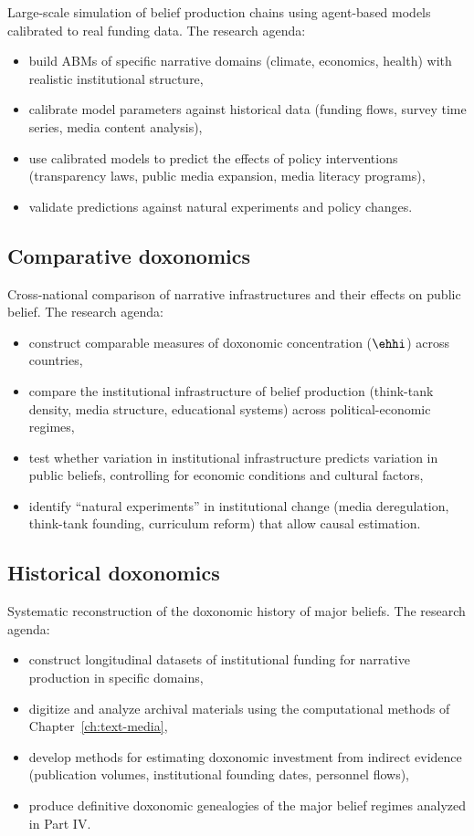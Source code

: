 Large-scale simulation of belief production chains using agent-based models calibrated to real funding data.
The research agenda:
\begin{itemize}[nosep]
  \item build ABMs of specific narrative domains (climate, economics, health) with realistic institutional structure,
  \item calibrate model parameters against historical data (funding flows, survey time series, media content analysis),
  \item use calibrated models to predict the effects of policy interventions (transparency laws, public media expansion, media literacy programs),
  \item validate predictions against natural experiments and policy changes.
\end{itemize}

\subsection{Comparative doxonomics}

Cross-national comparison of narrative infrastructures and their effects on public belief.
The research agenda:
\begin{itemize}[nosep]
  \item construct comparable measures of doxonomic concentration ($\ehhi$) across countries,
  \item compare the institutional infrastructure of belief production (think-tank density, media structure, educational systems) across political-economic regimes,
  \item test whether variation in institutional infrastructure predicts variation in public beliefs, controlling for economic conditions and cultural factors,
  \item identify ``natural experiments'' in institutional change (media deregulation, think-tank founding, curriculum reform) that allow causal estimation.
\end{itemize}

\subsection{Historical doxonomics}

Systematic reconstruction of the doxonomic history of major beliefs.
The research agenda:
\begin{itemize}[nosep]
  \item construct longitudinal datasets of institutional funding for narrative production in specific domains,
  \item digitize and analyze archival materials using the computational methods of Chapter~\ref{ch:text-media},
  \item develop methods for estimating doxonomic investment from indirect evidence (publication volumes, institutional founding dates, personnel flows),
  \item produce definitive doxonomic genealogies of the major belief regimes analyzed in Part IV.
\end{itemize}

